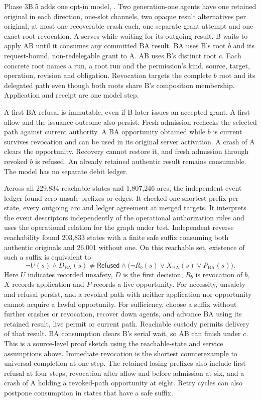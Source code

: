 \documentclass[11pt,a4paper]{article}
\theoremstyle{definition}
\theoremstyle{remark}
\begin{document}
Phase 3B.5 adds one opt-in model, . Two generation-one agents have one retained original in each direction, one-slot channels, two opaque result alternatives per original, at most one recoverable crash each, one separate grant attempt and one exact-root revocation. A serves while waiting for its outgoing result. B waits to apply AB until it consumes any committed BA result. BA uses B's root $b$ and its request-bound, non-redelegable grant to A. AB uses B's distinct root $c$. Each concrete root names a run, a root run and the permission's kind, source, target, operation, revision and obligation. Revocation targets the complete $b$ root and its delegated path even though both roots share B's composition membership. Application and receipt are one model step.

A first BA refusal is immutable, even if B later issues an accepted grant. A first allow and the issuance outcome also persist. Fresh admission rechecks the selected path against current authority. A BA opportunity obtained while $b$ is current survives revocation and can be used in its original server activation. A crash of A clears the opportunity. Recovery cannot restore it, and fresh admission through revoked $b$ is refused. An already retained authentic result remains consumable. The model has no separate debit ledger.

Across all 229,834 reachable states and 1,807,246 arcs, the independent event ledger found zero unsafe prefixes or edges. It checked one shortest prefix per state, every outgoing arc and ledger agreement at merged targets. It interprets the event descriptors independently of the operational authorization rules and uses the operational relation for the graph under test. Independent reverse reachability found 203,833 states with a finite safe suffix consuming both authentic originals and 26,001 without one. On this reachable set, existence of such a suffix is equivalent to
\[
  \neg U(s) \land D_{\mathrm{BA}}(s) \ne \mathsf{Refused}
  \land \bigl(\neg R_b(s) \lor X_{\mathrm{BA}}(s) \lor P_{\mathrm{BA}}(s)\bigr).
\]
Here $U$ indicates recorded unsafety, $D$ is the first decision, $R_b$ is revocation of $b$, $X$ records application and $P$ records a live opportunity. For necessity, unsafety and refusal persist, and a revoked path with neither application nor opportunity cannot acquire a lawful opportunity. For sufficiency, choose a suffix without further crashes or revocation, recover down agents, and advance BA using its retained result, live permit or current path. Reachable custody permits delivery of that result. BA consumption clears B's serial wait, so AB can finish under $c$. This is a source-level proof sketch using the reachable-state and service assumptions above. Immediate revocation is the shortest counterexample to universal completion at one step. The retained losing prefixes also include first refusal at four steps, revocation after allow and before admission at six, and a crash of A holding a revoked-path opportunity at eight. Retry cycles can also postpone consumption in states that have a safe suffix.
\end{document}
